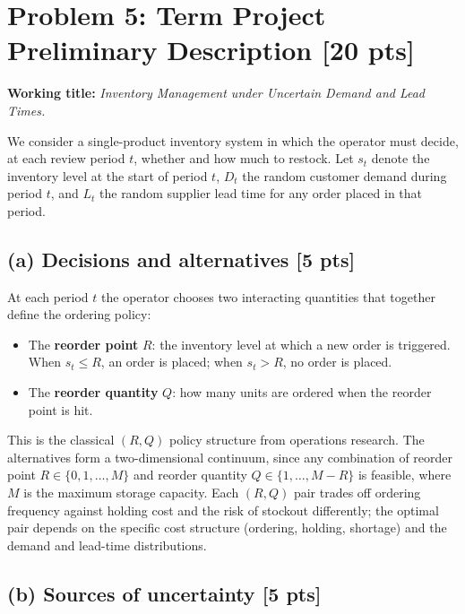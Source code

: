 \documentclass[12pt]{article}
\begin{document}
\section*{Problem 5: Term Project Preliminary Description \hfill [20 pts]}

\textbf{Working title:} \emph{Inventory Management under Uncertain Demand and Lead Times.}

We consider a single-product inventory system in which the operator must decide, at each review period $t$, whether and how much to restock. Let $s_t$ denote the inventory level at the start of period $t$, $D_t$ the random customer demand during period $t$, and $L_t$ the random supplier lead time for any order placed in that period.

\subsection*{(a) Decisions and alternatives [5 pts]}

At each period $t$ the operator chooses two interacting quantities that together define the ordering policy:
\begin{itemize}[leftmargin=1.5em,itemsep=2pt]
  \item The \textbf{reorder point} $R$: the inventory level at which a new order is triggered. When $s_t \le R$, an order is placed; when $s_t > R$, no order is placed.
  \item The \textbf{reorder quantity} $Q$: how many units are ordered when the reorder point is hit.
\end{itemize}
This is the classical $(R, Q)$ policy structure from operations research. The alternatives form a two-dimensional continuum, since any combination of reorder point $R \in \{0, 1, \dots, M\}$ and reorder quantity $Q \in \{1, \dots, M - R\}$ is feasible, where $M$ is the maximum storage capacity. Each $(R, Q)$ pair trades off ordering frequency against holding cost and the risk of stockout differently; the optimal pair depends on the specific cost structure (ordering, holding, shortage) and the demand and lead-time distributions.

\subsection*{(b) Sources of uncertainty [5 pts]}
\end{document}
